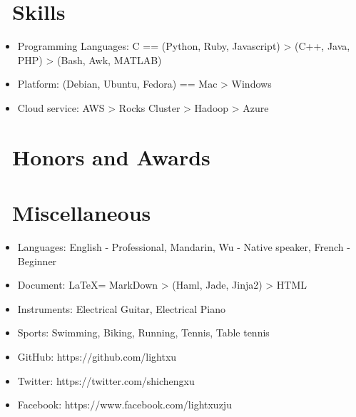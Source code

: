 \documentclass{resume}
\begin{document}

\section{\faCogs\ Skills}
\begin{itemize}[parsep=0.5ex]
  \item Programming Languages: C == (Python, Ruby, Javascript) > (C++, Java, PHP) > (Bash, Awk, MATLAB)
  \item Platform: (Debian, Ubuntu, Fedora) == Mac > Windows
  \item Cloud service: AWS > Rocks Cluster > Hadoop > Azure
\end{itemize}

\section{\faHeartO\ Honors and Awards}

\section{\faInfo\ Miscellaneous}
\begin{itemize}[parsep=0.5ex]
  \item Languages: English - Professional, Mandarin, Wu - Native speaker, French - Beginner
  \item Document: \LaTeX = MarkDown > (Haml, Jade, Jinja2) > HTML
  \item Instruments: Electrical Guitar, Electrical Piano
  \item Sports: Swimming, Biking, Running, Tennis, Table tennis
  \item GitHub: https://github.com/lightxu
  \item Twitter: https://twitter.com/shichengxu
  \item Facebook: https://www.facebook.com/lightxuzju
\end{itemize}
\end{document}
